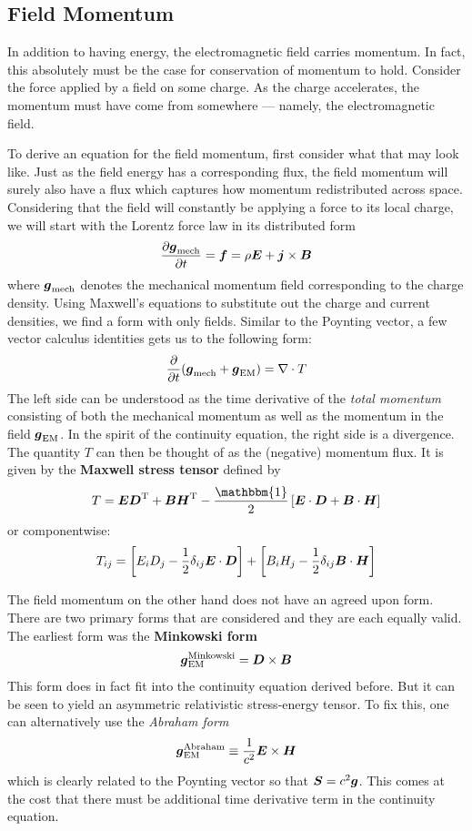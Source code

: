 \documentclass[twocolumn]{gwclass}
\begin{document}
\subsection{Field Momentum}
In addition to having energy, the electromagnetic field carries momentum. In fact, this absolutely must be the case for conservation of momentum to hold. Consider the force applied by a field on some charge. As the charge accelerates, the momentum must have come from somewhere --- namely, the electromagnetic field. 

To derive an equation for the field momentum, first consider what that may look like. Just as the field energy has a corresponding flux, the field momentum will surely also have a flux which captures how momentum redistributed across space. Considering that the field will constantly be applying a force to its local charge, we will start with the Lorentz force law in its distributed form
$$ \frac{\partial \boldsymbol{g}_{\text{\normalfont{mech}}}}{\partial t} = \boldsymbol{f} = \rho\boldsymbol{E} + \boldsymbol{j}\times\boldsymbol{B} $$ 
where $\boldsymbol{g}_{\text{\normalfont{mech}}}$ denotes the mechanical momentum field corresponding to the charge density. Using Maxwell's equations to substitute out the charge and current densities, we find a form with only fields. Similar to the Poynting vector, a few vector calculus identities gets us to the following form:
$$ \frac{\partial}{\partial t} (\boldsymbol{g}_{\text{\normalfont{mech}}} + \boldsymbol{g}_{\text{\normalfont{EM}}}) = \nabla\cdot T $$
The left side can be understood as the time derivative of the \emph{total momentum} consisting of both the mechanical momentum as well as the momentum in the field $\boldsymbol{g}_{\text{\normalfont{EM}}}$. In the spirit of the continuity equation, the right side is a divergence. The quantity $T$ can then be thought of as the (negative) momentum flux. It is given by the \textbf{Maxwell stress tensor} defined by
$$ T = \*E\*D^\t{T} + \*B\*H^\t{T} - \frac{\mathbbm{1}}{2}\left[\*E\cdot\*D + \*B\cdot\*H\right] $$
or componentwise:
$$ T_{ij} = \left[E_i D_j - \frac{1}{2}\delta_{ij}\boldsymbol{E}\cdot\boldsymbol{D}\right] + \left[B_iH_j - \frac{1}{2}\delta_{ij}\boldsymbol{B}\cdot\boldsymbol{H}\right]$$


The field momentum on the other hand does not have an agreed upon form. There are two primary forms that are considered and they are each equally valid. The earliest form was the \textbf{Minkowski form}
$$ \boldsymbol{g}_{\text{\normalfont{EM}}}^{\text{\normalfont{Minkowski}}} = \boldsymbol{D}\times\boldsymbol{B} $$
This form does in fact fit into the continuity equation derived before. But it can be seen to yield an asymmetric relativistic stress-energy tensor. To fix this, one can alternatively use the \emph{Abraham form}
$$ \boldsymbol{g}_{\text{\normalfont{EM}}}^{\text{\normalfont{Abraham}}} \equiv  \frac{1}{c^2}\boldsymbol{E}\times\boldsymbol{H}$$
which is clearly related to the Poynting vector so that $\boldsymbol{S}=c^2\boldsymbol{g}$. This comes at the cost that there must be additional time derivative term in the continuity equation.
\end{document}
